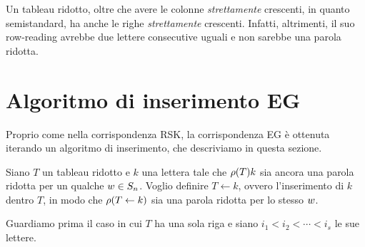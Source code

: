 \begin{remark}
    \label{rmk:tab_ridotto_crescenza}
    Un tableau ridotto, oltre che avere le colonne \emph{strettamente} crescenti, 
    in quanto semistandard, ha anche le righe \emph{strettamente} crescenti.
    Infatti, altrimenti, il suo row-reading avrebbe due lettere consecutive
    uguali e non sarebbe una parola ridotta.
\end{remark}
    


\section{Algoritmo di inserimento EG}

Proprio come nella corrispondenza RSK, la corrispondenza EG \`e ottenuta iterando 
un algoritmo di inserimento, che descriviamo in questa sezione.


Siano $T$ un tableau ridotto e $k$ una lettera tale che $\operatorname{\rho}(T)k$ sia ancora una
parola ridotta per un qualche $w \in S_n$.
Voglio definire $T \leftarrow k$, ovvero l'inserimento di $k$ dentro $T$, in modo
che $\operatorname{\rho}(T \leftarrow k)$ sia una parola ridotta per lo stesso $w$.

Guardiamo prima il caso in cui $T$ ha una sola riga e siano 
$i_1 < i_2 < \cdots < i_s$ le sue lettere.


